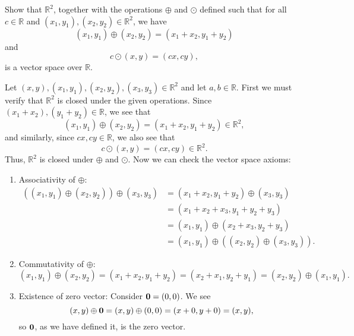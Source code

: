\begin{exmp}
Show that $ \mathbb{R}^2 $, together with the operations $ \oplus $ and $ \odot $ defined such that for all $ c\in\mathbb{R} $ and $ (x_1,y_1),(x_2,y_2)\in\mathbb{R}^2 $, we have
\begin{equation*}
    (x_1,y_1)\oplus(x_2,y_2)=(x_1+x_2,y_1+y_2)
\end{equation*}
and
\begin{equation*}
    c\odot(x,y)=(cx,cy),
\end{equation*}
is a vector space over $ \mathbb{R} $.
\end{exmp}
\begin{sltn}
Let $ (x,y),(x_1,y_1),(x_2,y_2),(x_3,y_3)\in\mathbb{R}^2 $ and let $ a,b\in\mathbb{R} $. First we must verify that $ \mathbb{R}^2 $ is closed under the given operations. Since $ (x_1+x_2),(y_1+y_2)\in\mathbb{R} $, we see that
\begin{equation*}
    (x_1,y_1)\oplus(x_2,y_2)=(x_1+x_2,y_1+y_2)\in\mathbb{R}^2,
\end{equation*}
and similarly, since $ cx,cy\in\mathbb{R} $, we also see that
\begin{equation*}
    c\odot(x,y)=(cx,cy)\in\mathbb{R}^2.
\end{equation*}
Thus, $ \mathbb{R}^2 $ is closed under $ \oplus $ and $ \odot $. Now we can check the vector space axioms:
\begin{enumerate}
    \item Associativity of $ \oplus $:
    \begin{align*}
        ((x_1,y_1)\oplus(x_2,y_2))\oplus(x_3,y_3) &= (x_1+x_2,y_1+y_2)\oplus(x_3,y_3) \\
        &= (x_1+x_2+x_3,y_1+y_2+y_3) \\
        &= (x_1,y_1)\oplus(x_2+x_3,y_2+y_3) \\
        &= (x_1,y_1)\oplus((x_2,y_2)\oplus(x_3,y_3)).
    \end{align*}

    \item Commutativity of $ \oplus $:
    \begin{equation*}
        (x_1,y_1)\oplus(x_2,y_2)=(x_1+x_2,y_1+y_2)=(x_2+x_1,y_2+y_1)=(x_2,y_2)\oplus(x_1,y_1).
    \end{equation*}

    \item Existence of zero vector: Consider $ \boldsymbol{\mathbf{0}}=(0,0) $. We see
    \begin{equation*}
        (x,y)\oplus\boldsymbol{\mathbf{0}}=(x,y)\oplus(0,0)=(x+0,y+0)=(x,y),
    \end{equation*}
    so $ \boldsymbol{\mathbf{0}} $, as we have defined it, is the zero vector.


\end{enumerate}
\end{sltn}

